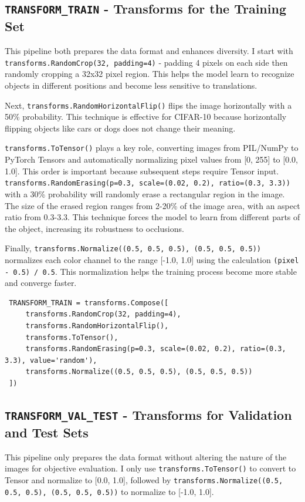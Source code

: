\documentclass[12pt, a4paper, openany]{report}
\begin{document}
 \subsection{\texttt{TRANSFORM\_TRAIN} - Transforms for the Training Set} %
 This pipeline both prepares the data format and enhances diversity. I start with \texttt{transforms.RandomCrop(32, padding=4)} - padding 4 pixels on each side then randomly cropping a 32x32 pixel region. This helps the model learn to recognize objects in different positions and become less sensitive to translations.

 Next, \texttt{transforms.RandomHorizontalFlip()} flips the image horizontally with a 50\% probability. This technique is effective for CIFAR-10 because horizontally flipping objects like cars or dogs does not change their meaning.

 \texttt{transforms.ToTensor()} plays a key role, converting images from PIL/NumPy to PyTorch Tensors and automatically normalizing pixel values from [0, 255] to [0.0, 1.0]. This order is important because subsequent steps require Tensor input. \texttt{transforms.RandomErasing(p=0.3, scale=(0.02, 0.2), ratio=(0.3, 3.3))} with a 30\% probability will randomly erase a rectangular region in the image. The size of the erased region ranges from 2-20\% of the image area, with an aspect ratio from 0.3-3.3. This technique forces the model to learn from different parts of the object, increasing its robustness to occlusions.

 Finally, \texttt{transforms.Normalize((0.5, 0.5, 0.5), (0.5, 0.5, 0.5))} normalizes each color channel to the range [-1.0, 1.0] using the calculation \texttt{(pixel - 0.5) / 0.5}. This normalization helps the training process become more stable and converge faster.

 \begin{verbatim}
 TRANSFORM_TRAIN = transforms.Compose([
     transforms.RandomCrop(32, padding=4),
     transforms.RandomHorizontalFlip(),
     transforms.ToTensor(),
     transforms.RandomErasing(p=0.3, scale=(0.02, 0.2), ratio=(0.3, 3.3), value='random'),
     transforms.Normalize((0.5, 0.5, 0.5), (0.5, 0.5, 0.5))
 ])
 \end{verbatim}

 \subsection{\texttt{TRANSFORM\_VAL\_TEST} - Transforms for Validation and Test Sets} %
 This pipeline only prepares the data format without altering the nature of the images for objective evaluation. I only use \texttt{transforms.ToTensor()} to convert to Tensor and normalize to [0.0, 1.0], followed by \texttt{transforms.Normalize((0.5, 0.5, 0.5), (0.5, 0.5, 0.5))} to normalize to [-1.0, 1.0].
\end{document}
